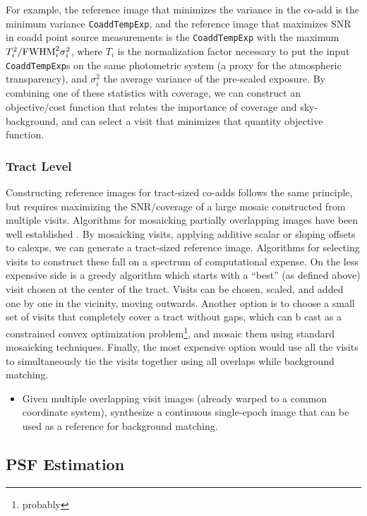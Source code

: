 For example, the reference image that minimizes the variance in the co-add is the minimum variance \texttt{CoaddTempExp}, and
the reference image that maximizes SNR in coadd point source measurements is the \texttt{CoaddTempExp} with the maximum
$T^2_i/{\rm FWHM}^2_i \sigma^2_i$, where $T_i$ is
the normalization factor necessary to put the input \texttt{CoaddTempExp}s on the same photometric system (a proxy for the atmospheric transparency),
and $\sigma^2_i$ the average variance of the pre-scaled exposure.  By combining one of
these statistics with coverage, we can construct an objective/cost function that relates the importance of
coverage and sky-background, and can select a visit that minimizes that quantity objective function.

\subsubsection{Tract Level}
Constructing reference images for tract-sized co-adds follows the same principle, but requires maximizing the
SNR/coverage of a large mosaic constructed from multiple visits.  Algorithms for mosaicking partially
overlapping images have been well established \citep[e.g.][]{Sick2013, Berriman2008}. By mosaicking visits,
applying additive scalar or sloping offsets to calexps, we can generate a tract-sized reference image.
Algorithms for selecting visits to construct these fall on a spectrum of computational expense. On the less
expensive side is a greedy algorithm which starts with a ``best'' (as defined above) visit chosen at the
center of the tract.  Visits can be chosen, scaled, and added one by one in the vicinity, moving outwards.
Another option is to choose a small set of visits that completely cover a tract without gaps, which can b
cast as a constrained convex optimization problem\footnote{probably}, and mosaic them using standard
mosaicking techniques.  Finally, the most expensive option would use all the visits to simultaneously tie the
visits together using all overlaps while background matching.

\begin{itemize}
\item Given multiple overlapping visit images (already warped to a common coordinate system), synthesize a continuous single-epoch image that can be used as a reference for background matching.
\end{itemize}

\subsection{PSF Estimation}
\label{sec:acPSFEstimation}

